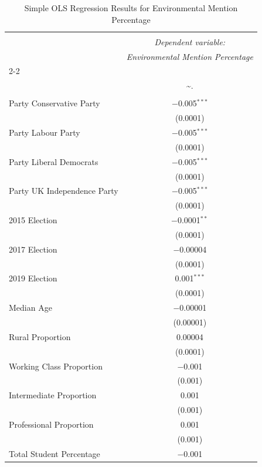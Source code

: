 \documentclass[preprint,12pt,authoryear]{elsarticle}
\begin{document}
\begin{table}[!htbp] \centering
	\caption{Simple OLS Regression Results for Environmental Mention Percentage}
	\label{tab:OLS}
	\footnotesize %
	\setlength{\tabcolsep}{4pt} %
	\renewcommand{\arraystretch}{0.9} %
\begin{tabular}{@{\extracolsep{5pt}}lc}
\\[-1.8ex]\hline
\hline \\[-1.8ex]
 & \multicolumn{1}{c}{\textit{Dependent variable:}} \\
 & \multicolumn{1}{c}{\textit{Environmental Mention Percentage}} \\
\cline{2-2}
\\[-1.8ex] & \textasciitilde . \\
\hline \\[-1.8ex]
 Party Conservative Party & $-$0.005$^{***}$ \\ 
	& (0.0001) \\
 Party Labour Party & $-$0.005$^{***}$ \\
	& (0.0001) \\
 Party Liberal Democrats & $-$0.005$^{***}$ \\
	& (0.0001) \\ 
 Party UK Independence Party & $-$0.005$^{***}$ \\
	& (0.0001) \\
 2015 Election & $-$0.0001$^{**}$ \\
	& (0.0001) \\
 2017 Election & $-$0.00004 \\
	& (0.0001) \\
 2019 Election & 0.001$^{***}$ \\
	& (0.0001) \\ 
 Median Age & $-$0.00001 \\
	& (0.00001) \\
 Rural Proportion & 0.00004 \\
	& (0.0001) \\
 Working Class Proportion & $-$0.001 \\
	& (0.001) \\
 Intermediate Proportion & 0.001 \\
	& (0.001) \\
 Professional Proportion & 0.001 \\
	& (0.001) \\
 Total Student Percentage & $-$0.001 \\

\end{tabular}
\end{table}
\end{document}
